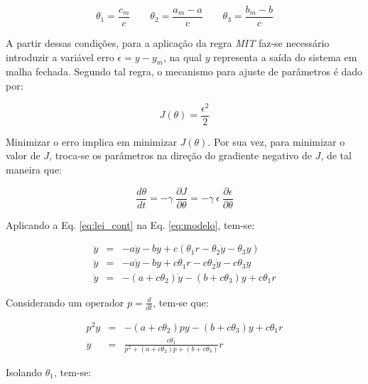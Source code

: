 \begin{equation}
\theta_1 = \frac{c_m}{c}
\qquad
\theta_2 = \frac{a_m - a}{c}
\qquad
\theta_3 = \frac{b_m - b}{c}
\end{equation}

A partir dessas condições, para a aplicação da regra {\it MIT} faz-se necessário
introduzir a variável erro $\epsilon = y - y_m$, na qual $y$ representa a saída
do sistema em malha fechada. Segundo tal regra, o mecanismo para ajuste de
parâmetros é dado por:

\begin{equation}
J(\theta) = \frac{\epsilon^2}{2}
\end{equation}

Minimizar o erro implica em minimizar $J(\theta)$. Por sua vez, para minimizar o
valor de $J$, troca-se os parâmetros na direção do gradiente negativo de $J$, de
tal maneira que:

\begin{equation}\label{eq:J}
\frac{d\theta}{dt} = -\gamma\ \frac{\partial J}{\partial \theta} = 
                     -\gamma\ \epsilon\ \frac{\partial \epsilon}
                                             {\partial \theta}
\end{equation}

Aplicando a Eq. \ref{eq:lei_cont} na Eq. \ref{eq:modelo}, tem-se:

\begin{eqnarray}
\ddot{y} & = & -a\dot{y} - by + c \left( \theta_1r - 
                                         \theta_2\dot{y} - 
                                         \theta_3y\right)\nonumber\\
\ddot{y} & = & -a\dot{y} - by + c\theta_1r - 
                                c\theta_2\dot{y} -
                                c\theta_3y\nonumber\\
\ddot{y} & = & -(a + c\theta_2)\dot{y} - (b + c\theta_3)y + c\theta_1r\nonumber
\end{eqnarray}

Considerando um operador $p = \frac{d}{dt}$, tem-se que:

\begin{eqnarray}
p^2y & = & - (a + c\theta_2)py - 
             (b + c\theta_3)y + 
             c\theta_1r\nonumber\\
y & = & \frac{c\theta_1}{p^2 + 
                         (a + c\theta_2)p + 
                         (b + c\theta_3)}r\label{eq:y}
\end{eqnarray}

Isolando $\theta_1$, tem-se:

